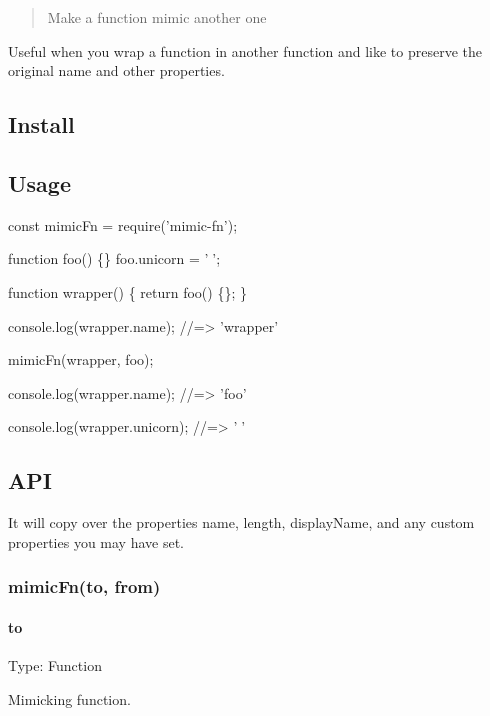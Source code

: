 \begin{quote}
Make a function mimic another one \end{quote}


Useful when you wrap a function in another function and like to preserve the original name and other properties.

\subsection*{Install}




\subsection*{Usage}


\begin{DoxyCode}
const mimicFn = require('mimic-fn');

function foo() \{\}
foo.unicorn = '🦄';

function wrapper() \{
    return foo() \{\};
\}

console.log(wrapper.name);
//=> 'wrapper'

mimicFn(wrapper, foo);

console.log(wrapper.name);
//=> 'foo'

console.log(wrapper.unicorn);
//=> '🦄'
\end{DoxyCode}


\subsection*{A\+PI}

It will copy over the properties {\ttfamily name}, {\ttfamily length}, {\ttfamily display\+Name}, and any custom properties you may have set.

\subsubsection*{mimic\+Fn(to, from)}

\paragraph*{to}

Type\+: {\ttfamily Function}

Mimicking function.

